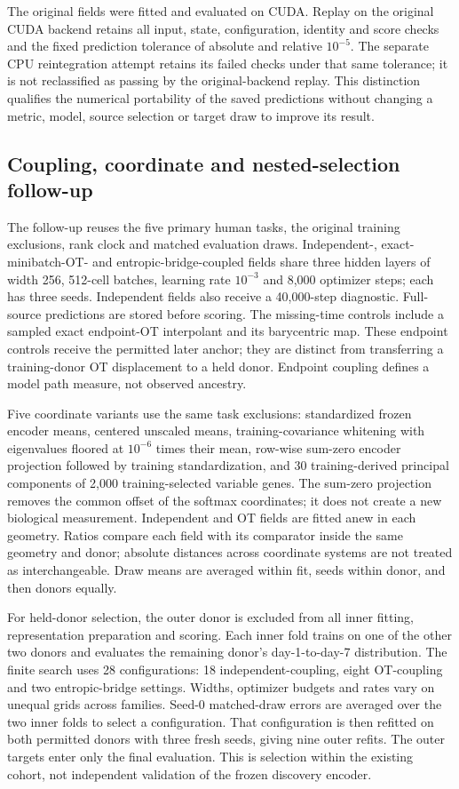 \documentclass[10pt,a4paper]{article}
\begin{document}
The original fields were fitted and evaluated on CUDA. Replay on the original CUDA backend retains all input, state, configuration, identity and score checks and the fixed prediction tolerance of absolute and relative $10^{-5}$. The separate CPU reintegration attempt retains its failed checks under that same tolerance; it is not reclassified as passing by the original-backend replay. This distinction qualifies the numerical portability of the saved predictions without changing a metric, model, source selection or target draw to improve its result.
\subsection{Coupling, coordinate and nested-selection follow-up}
The follow-up reuses the five primary human tasks, the original training exclusions, rank clock and matched evaluation draws. Independent-, exact-minibatch-OT- and entropic-bridge-coupled fields share three hidden layers of width 256, 512-cell batches, learning rate $10^{-3}$ and 8,000 optimizer steps; each has three seeds. Independent fields also receive a 40,000-step diagnostic. Full-source predictions are stored before scoring. The missing-time controls include a sampled exact endpoint-OT interpolant and its barycentric map. These endpoint controls receive the permitted later anchor; they are distinct from transferring a training-donor OT displacement to a held donor. Endpoint coupling defines a model path measure, not observed ancestry.

Five coordinate variants use the same task exclusions: standardized frozen encoder means, centered unscaled means, training-covariance whitening with eigenvalues floored at $10^{-6}$ times their mean, row-wise sum-zero encoder projection followed by training standardization, and 30 training-derived principal components of 2,000 training-selected variable genes. The sum-zero projection removes the common offset of the softmax coordinates; it does not create a new biological measurement. Independent and OT fields are fitted anew in each geometry. Ratios compare each field with its comparator inside the same geometry and donor; absolute distances across coordinate systems are not treated as interchangeable. Draw means are averaged within fit, seeds within donor, and then donors equally.

For held-donor selection, the outer donor is excluded from all inner fitting, representation preparation and scoring. Each inner fold trains on one of the other two donors and evaluates the remaining donor's day-1-to-day-7 distribution. The finite search uses 28 configurations: 18 independent-coupling, eight OT-coupling and two entropic-bridge settings. Widths, optimizer budgets and rates vary on unequal grids across families. Seed-0 matched-draw errors are averaged over the two inner folds to select a configuration. That configuration is then refitted on both permitted donors with three fresh seeds, giving nine outer refits. The outer targets enter only the final evaluation. This is selection within the existing cohort, not independent validation of the frozen discovery encoder.
\end{document}
